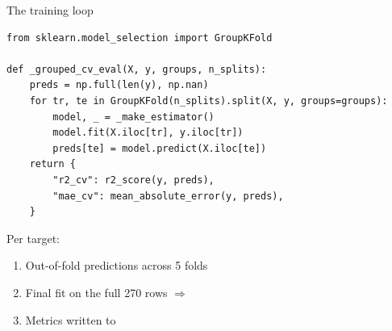 \begin{frame}[fragile]{The training loop}
\begin{lstlisting}
from sklearn.model_selection import GroupKFold

def _grouped_cv_eval(X, y, groups, n_splits):
    preds = np.full(len(y), np.nan)
    for tr, te in GroupKFold(n_splits).split(X, y, groups=groups):
        model, _ = _make_estimator()
        model.fit(X.iloc[tr], y.iloc[tr])
        preds[te] = model.predict(X.iloc[te])
    return {
        "r2_cv": r2_score(y, preds),
        "mae_cv": mean_absolute_error(y, preds),
    }
\end{lstlisting}

  \vspace{0.3cm}
  Per target:
  \begin{enumerate}\small
    \item Out-of-fold predictions across 5 folds
    \item Final fit on the full 270 rows \(\Rightarrow\) 
    \item Metrics written to 
  \end{enumerate}
\end{frame}

